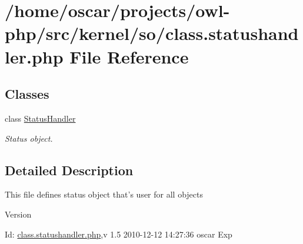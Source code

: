 \section{/home/oscar/projects/owl-\/php/src/kernel/so/class.statushandler.php File Reference}
\label{class_8statushandler_8php}
\subsection*{Classes}
\begin{DoxyCompactItemize}
\item 
class \hyperlink{classStatusHandler}{StatusHandler}
\begin{DoxyCompactList}\small\item\em Status object. \item\end{DoxyCompactList}\end{DoxyCompactItemize}


\subsection{Detailed Description}
This file defines status object that's user for all objects \begin{DoxyVersion}{Version}

\end{DoxyVersion}
\begin{DoxyParagraph}{Id:}
\hyperlink{class_8statushandler_8php}{class.statushandler.php},v 1.5 2010-\/12-\/12 14:27:36 oscar Exp 
\end{DoxyParagraph}
